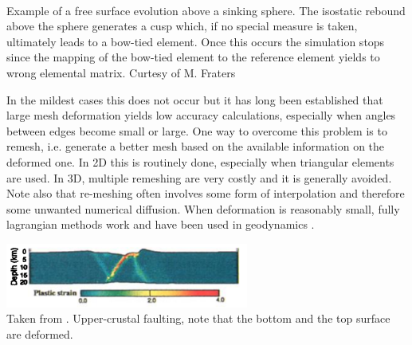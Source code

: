 \begin{center}
\\
{\tiny Example of a free surface evolution above a sinking sphere. The isostatic rebound above the sphere 
generates a cusp which, if no special measure is taken, ultimately leads to a bow-tied element. Once this 
occurs the simulation stops since the mapping of the bow-tied element to the reference element yields to
wrong elemental matrix. Curtesy of M. Fraters}
\end{center}

In the mildest cases this does not occur but it has long been established that 
large mesh deformation yields low accuracy calculations, 
especially when angles between edges become small or large. 
One way to overcome this problem is to remesh, i.e. generate a better mesh based on the 
available information on the deformed one. In 2D this is routinely done, especially when 
triangular elements are used. In 3D, multiple remeshing are very costly and it is generally
avoided.  
Note also that re-meshing often involves some form of interpolation and therefore some unwanted 
numerical diffusion. 
When deformation is reasonably small, fully lagrangian methods work and have been used in 
geodynamics \cite{hach96b,mera80,labp00}.

\begin{center}
\includegraphics[width=8cm]{images/freesurface/labp00}\\
{\captionfont Taken from \cite{labp00}. Upper-crustal faulting, note that the bottom and the top surface are deformed.}
\end{center}


